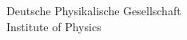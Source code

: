 %


\begin{small} \color{black}
Deutsche Physikalische Gesellschaft \\
Institute of Physics \\
\end{small}
